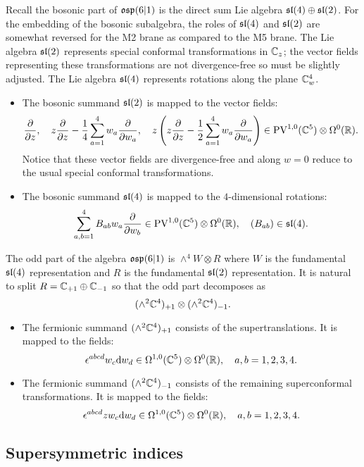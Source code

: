 \documentclass[11pt]{amsart}
\begin{document}
\parsec[]

Recall the bosonic part of $\mathfrak{osp}(6|1)$ is the direct sum Lie algebra $\mathfrak{sl}(4) \oplus \mathfrak{sl}(2)$. 
For the embedding of the bosonic subalgebra, the roles of $\mathfrak{sl}(4)$ and $\mathfrak{sl}(2)$ are somewhat reversed for the M2 brane as compared to the M5 brane. 
The Lie algebra $\mathfrak{sl}(2)$ represents special conformal transformations in $\mathbb C_z$; the vector fields representing these transformations are not divergence-free so must be slightly adjusted. 
The Lie algebra $\mathfrak{sl}(4)$ represents rotations along the plane $\mathbb C^4_w$.   


\begin{itemize}
\item The bosonic summand $\mathfrak{sl}(2)$ is mapped to the vector fields:
\[
\frac{\partial}{\partial z} ,\quad z \frac{\partial}{\partial z} - \frac14 \sum_{a=1}^4 w_a \frac{\partial}{\partial w_a} , \quad z \left(z \frac{\partial}{\partial z} - \frac12 \sum_{a=1}^4 w_a \frac{\partial}{\partial w_a} \right) \in {\rm PV}^{1,0}(\mathbb C^5) \otimes \Omega^0(\mathbb R) .
\]
Notice that these vector fields are divergence-free and along $w=0$ reduce to the usual special conformal transformations.
\item The bosonic summand $\mathfrak{sl}(4)$ is mapped to the $4$-dimensional rotations: 
\[
\sum_{a,b=1}^4 B_{ab} w_a \frac{\partial}{\partial w_b} \in {\rm PV}^{1,0}(\mathbb C^5) \otimes \Omega^0(\mathbb R) , \quad (B_{ab}) \in \mathfrak{sl}(4) .
\]
\end{itemize}

The odd part of the algebra $\mathfrak{osp}(6|1)$ is $\wedge^4 W \otimes R$ where $W$ is the fundamental $\mathfrak{sl}(4)$ representation and $R$ is the fundamental $\mathfrak{sl}(2)$ representation. 
It is natural to split $R = \mathbb C_{+1} \oplus \mathbb C_{-1}$ so that the odd part decomposes as
\[
(\wedge^2 \mathbb C^4)_{+1} \otimes (\wedge^2 \mathbb C^4)_{-1} .
\]

\begin{itemize}
\item 
The fermionic summand $(\wedge^2 \mathbb C^4)_{+1}$ consists of the supertranslations. 
It is mapped to the fields: 
\[
\epsilon^{abcd} w_c {\rm d} w_d \in \Omega^{1,0}(\mathbb C^5) \otimes \Omega^0(\mathbb R) , \quad a,b=1,2,3,4. 
\] 
\item The fermionic summand $(\wedge^2 \mathbb C^4)_{-1}$ consists of the remaining superconformal transformations. 
It is mapped to the fields: 
\[
\epsilon^{abcd} z w_c {\rm d} w_d \in \Omega^{1,0}(\mathbb C^5) \otimes \Omega^0(\mathbb R) , \quad a,b=1,2,3,4. 
\] 
\end{itemize}

\subsection{Supersymmetric indices}
\end{document}
